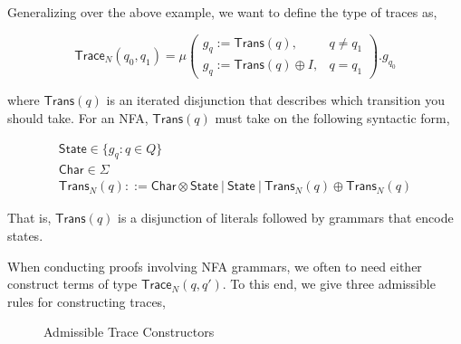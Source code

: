 \documentclass[acmsmall,screen,nonacm]{acmart}
\begin{document}
Generalizing over the above example, we want to define the type of traces as,

\[
  \mathsf{Trace}_{N}(q_{0}, q_{1}) = \mu
  \begin{pmatrix}
    g_{q} := \mathsf{Trans}(q), & q \neq q_{1} \\
    g_{q} := \mathsf{Trans}(q) \oplus I , & q = q_{1}
  \end{pmatrix}. g_{q_{0}}
\]

where $\mathsf{Trans}(q)$ is an iterated disjunction that describes which
transition you should take. For an NFA, $\mathsf{Trans}(q)$ must take on the
following syntactic form,

\begin{gather*}
 \mathsf{State} \in \{ g_{q} : q \in Q \} \\
 \mathsf{Char} \in \Sigma \\
 \mathsf{Trans}_{N}(q) ::= \mathsf{Char} \otimes \mathsf{State}~|~\mathsf{State}~|~\mathsf{Trans}_{N}(q) \oplus \mathsf{Trans}_{N}(q)
\end{gather*}

That is, $\mathsf{Trans}(q)$ is a disjunction of literals followed by grammars
that encode states.

When conducting proofs involving NFA grammars, we often to
need either construct terms of type $\mathsf{Trace}_{N}(q , q')$. To
this end, we give three admissible rules for constructing
traces,

\begin{figure}[h!]
  \label{fig:admissibleintro}
  \caption{Admissible Trace Constructors}
\end{figure}
\end{document}
